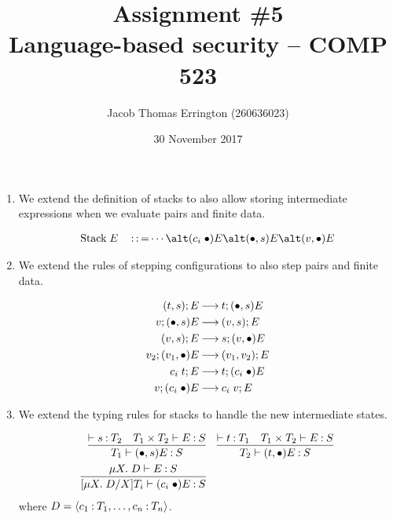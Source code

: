 \documentclass[11pt]{article}
\author{Jacob Thomas Errington (260636023)}
\title{Assignment \#5\\Language-based security -- COMP 523}
\date{30 November 2017}
\begin{document}
\maketitle


\begin{enumerate}
  \item
    We extend the definition of stacks to also allow storing intermediate
    expressions when we evaluate pairs and finite data.

    \begin{align*}
      \text{Stack}\; E\quad
      \operatorname{::=} \cdots
      \alt (c_i\; \bullet) E
      \alt (\bullet, s) E
      \alt (v, \bullet) E
    \end{align*}

  \item
    We extend the rules of stepping configurations to also step pairs and
    finite data.

    \begin{align*}
      (t, s); E &\mathbin{\longrightarrow} t; (\bullet, s) E \\
      v; (\bullet, s) E &\mathbin{\longrightarrow} (v, s); E \\
      (v, s); E &\mathbin{\longrightarrow} s; (v, \bullet) E \\
      v_2; (v_1, \bullet) E &\mathbin{\longrightarrow} (v_1, v_2) ; E \\
      c_i\; t; E &\mathbin{\longrightarrow} t; (c_i\; \bullet) E \\
      v; (c_i\; \bullet) E &\mathbin{\longrightarrow} c_i\; v ; E
    \end{align*}

  \item
    We extend the typing rules for stacks to handle the new intermediate
    states.

    \begin{align*}
      \infer{
        T_1 \proves (\bullet, s) E \hastype S
      }{
        \proves s \hastype T_2
        &
        T_1 \times T_2 \proves E \hastype S
      }
      &\quad
      \infer{
        T_2 \proves (t, \bullet) E \hastype S
      }{
        \proves t \hastype T_1
        &
        T_1 \times T_2 \proves E \hastype S
      } \\
      \infer{
        [\mu X.\; D/X]T_i \proves (c_i\; \bullet) E \hastype S
      }{
        \mu X.\; D \proves E \hastype S
      }
      &\quad
      ~
    \end{align*}
    where $D = \langle c_1\mathbin{:} T_1,\ldots,c_n\mathbin{:} T_n \rangle$.


\end{enumerate}
\end{document}
